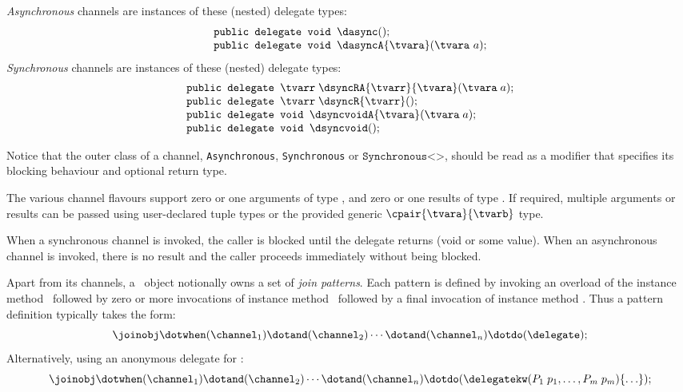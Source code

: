 \emph{Asynchronous} channels are instances of these (nested) delegate types: %
\[ 
\begin{array}{l}
  \texttt{public delegate void } \dasync();\\
  \texttt{public delegate void } \dasyncA{\tvara}(\tvara\ a);
\end{array}
\]
\emph{Synchronous} channels are instances of  these (nested) delegate types: %
\[ 
\begin{array}{l}
  \texttt{public delegate } \tvarr\; \dsyncRA{\tvarr}{\tvara}(\tvara\;a);\\
  \texttt{public delegate } \tvarr\; \dsyncR{\tvarr}();\\
  \texttt{public delegate void } \dsyncvoidA{\tvara}(\tvara\;a);\\
  \texttt{public delegate void } \dsyncvoid();\\
\end{array}
\]

Notice that the outer class of a channel, \texttt{Asynchronous}, \texttt{Synchronous} or $\texttt{Synchronous<}$\tvarr$\texttt{>}$,
should be read as a modifier that specifies its blocking behaviour and optional return type.

The various channel flavours support zero or one arguments of type \texttt\tvara, and zero or one results of type \texttt\tvarr.
If required, multiple arguments or results can be passed using user-declared tuple types or the provided generic
$\cpair{\tvara}{\tvarb}$ type.

When a synchronous channel is invoked, the caller
is blocked until the delegate returns (void or some value). 
When an asynchronous channel is invoked, there is no result and the
caller proceeds immediately without being blocked.

Apart from its channels, a \cjoin\ object notionally owns a set of \emph{join patterns}. Each pattern is defined by invoking an overload of 
the instance method \When\, followed by zero or more invocations of instance method \And\, followed by 
a final invocation of instance method \Do. Thus a pattern definition typically takes the form:
\[
  \joinobj\dotwhen(\channel_1)\dotand(\channel_2) \cdots \dotand(\channel_n)\dotdo(\delegate);
\]
Alternatively, using an anonymous delegate for \delegate: 
\[
  \joinobj\dotwhen(\channel_1)\dotand(\channel_2) \cdots \dotand(\channel_n)\dotdo(\delegatekw(P_1\;p_1, \ldots, P_m\;p_m)\{\ldots\});
\]

